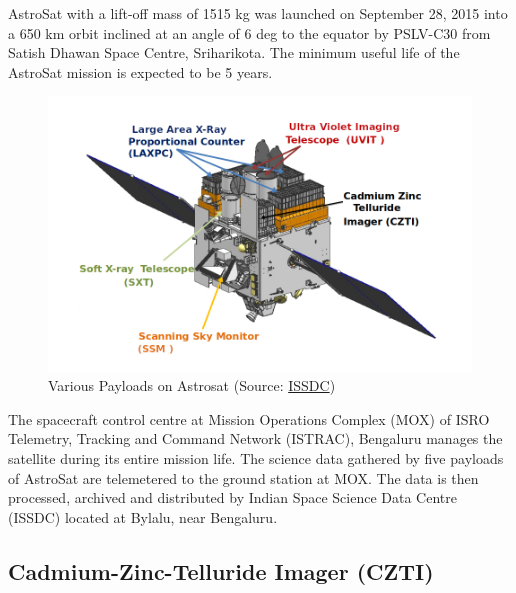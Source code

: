 \documentclass[11pt]{book} %
\begin{document}
AstroSat with a lift-off mass of 1515 kg was launched on September 28, 2015 into a 650 km orbit inclined at an angle of 6 deg to the equator by PSLV-C30 from Satish Dhawan Space Centre, Sriharikota. The minimum useful life of the AstroSat mission is expected to be 5 years.


\begin{figure}
    \centering
    \includegraphics[scale=0.8]{Pictures/astrosat_wireframe.png}
    \caption{Various Payloads on Astrosat (Source: \href{https://webapps.issdc.gov.in/astro_archive/archive/astrosat_images/astrosat_wireframe.png}{ISSDC})}
\end{figure}

The spacecraft control centre at Mission Operations Complex (MOX) of ISRO Telemetry, Tracking and Command Network (ISTRAC), Bengaluru manages the satellite during its entire mission life. The science data gathered by five payloads of AstroSat are telemetered to the ground station at MOX. The data is then processed, archived and distributed by Indian Space Science Data Centre (ISSDC) located at Bylalu, near Bengaluru.

\clearpage



\subsection{Cadmium-Zinc-Telluride Imager (CZTI)}
\end{document}

